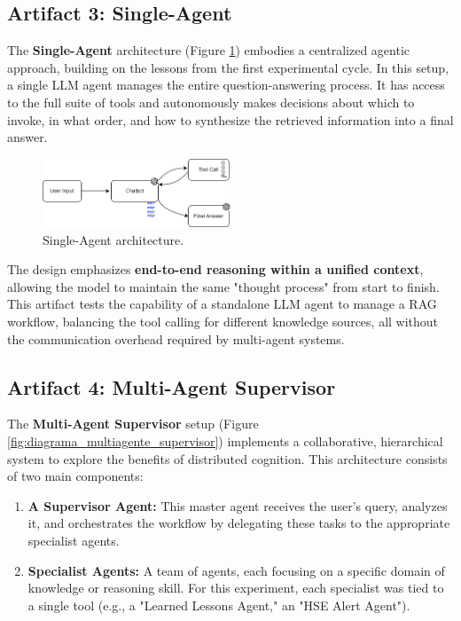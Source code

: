     \subsection{Artifact 3: Single-Agent}

        The \textbf{Single-Agent} architecture (Figure \ref{fig:diagrama_single_agent}) embodies a centralized agentic approach, building on the lessons from the first experimental cycle. In this setup, a single LLM agent manages the entire question-answering process. It has access to the full suite of tools and autonomously makes decisions about which to invoke, in what order, and how to synthesize the retrieved information into a final answer.
        
        \begin{figure}[h]
            \centering
            \includegraphics[width=0.5\textwidth]{images_exp2/diagrams/diagrama_single_agent.png}
            \caption{Single-Agent architecture.}
            \label{fig:diagrama_single_agent}
        \end{figure}    

        The design emphasizes \textbf{end-to-end reasoning within a unified context}, allowing the model to maintain the same "thought process" from start to finish. This artifact tests the capability of a standalone LLM agent to manage a RAG workflow, balancing the tool calling for different knowledge sources, all without the communication overhead required by multi-agent systems.
        

    \subsection{Artifact 4: Multi-Agent Supervisor}
    
        The \textbf{Multi-Agent Supervisor} setup (Figure \ref{fig:diagrama_multiagente_supervisor}) implements a collaborative, hierarchical system to explore the benefits of distributed cognition. This architecture consists of two main components:        

        \begin{enumerate}
            \item \textbf{A Supervisor Agent:} This master agent receives the user's query, analyzes it, and orchestrates the workflow by delegating these tasks to the appropriate specialist agents.
            \item \textbf{Specialist Agents:} A team of agents, each focusing on a specific domain of knowledge or reasoning skill. For this experiment, each specialist was tied to a single tool (e.g., a "Learned Lessons Agent," an "HSE Alert Agent").
        \end{enumerate}
        
